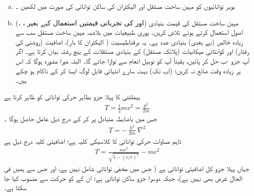 \begin{enumerate}[a.]
\item
بوہر توانائیوں کو مہین ساخت مستقل اور الیکٹران کی ساکن توانائی  کی صورت میں لکھیں ۔
\item
(، ،  اور  کی تجرباتی قیمتیں  استعمال کیے بغیر)  مہین ساخت مستقل کی قیمت   بنیادی اصول استعمال کرتے ہوئے  تلاش کریں۔  پوری طبیعیات میں  بلاشبہ مہین ساخت مستقل سب سے زیادہ خالص  (بے بعدی)   بنیادی عدد ہے۔  یہ برقناطیسیت (  الیکٹران کا بار)،  اضافیت  (روشنی کی رفتار)  اور کوانٹائی  میکانیات  (پلانک مستقل) کے بنیادی مستقلات کے بیچ رشتہ بیان کرتا ہے۔  اگر آپ جزو -ب حل کر پائیں،   یقیناً   آپ کو نوبیل انعام سے نوازا جائے گا۔ البتہ میرا مشورہ ہوگا کہ  اس پر زیادہ  وقت ضائع نہ کریں؛   (اب  تک) بہت سارے انتہائی قابل لوگ ایسا  کر کے       ناکام ہو چکے ہیں۔  
\end{enumerate}

ہیملٹنی کا پہلا جزو بظاہر حرکی توانائی کو ظاہر کرتا ہے 
\begin{align}\label{مساوات_غیر_مضطرب_حرکی_توانائی}
T = \frac{1}{2} mv^2 = \frac{p^2}{2m} 
\end{align}
جس میں باضابطہ متبادل  پر کر کے درج ذیل عامل حاصل ہوگا ۔
\begin{align}
T = - \frac{\hslash^2}{2m} \nabla^2
\end{align} 
تاہم مساوات    حرکی توانائی کا کلاسیکی کلیہ ہے؛  اضافیتی کلیہ درج ذیل ہے
\begin{align}
T = \frac{mc^2}{\sqrt{1 - (v/c)^2}} - mc^2
\end{align}
جہاں پہلا جزو کل اضافیتی  توانائی ہے ( جس میں مخفی توانائی شامل نہیں ہے،  اور جس سے ہمیں فی الحال غرض بھی نہیں ہے)،  جبکہ دوسرا جزو ساکن توانائی ہے؛  ان  کے کو    حرکت سے منسوب کیا جا سکتا ہے۔

